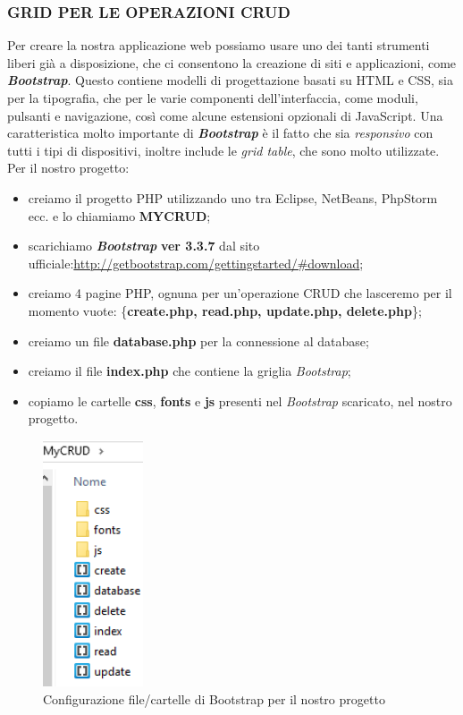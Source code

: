 \subsubsection{GRID PER LE OPERAZIONI CRUD}

Per creare la nostra applicazione web possiamo usare uno dei tanti strumenti liberi già a disposizione, che ci consentono la creazione di siti e applicazioni, come \textit{\textbf{Bootstrap}}. Questo contiene modelli di progettazione basati su HTML e CSS, sia per la tipografia, che per le varie componenti dell'interfaccia, come moduli, pulsanti e navigazione, così come alcune estensioni opzionali di JavaScript.  
Una caratteristica molto importante di \textit{\textbf{Bootstrap}} è il fatto che sia \textit{responsivo} con tutti i tipi di dispositivi, inoltre include le \textit{grid table}, che sono molto utilizzate.  
Per il nostro progetto:   

\begin{itemize}

\item creiamo il progetto PHP utilizzando uno tra Eclipse, NetBeans, PhpStorm ecc. e lo chiamiamo \textbf{MYCRUD};
\item scarichiamo \textit{\textbf{Bootstrap}} \textbf{ver 3.3.7} dal sito ufficiale:\newline\url{http://getbootstrap.com/gettingstarted/#download};
\item creiamo 4 pagine PHP, ognuna per un’operazione CRUD che lasceremo per il momento vuote: \{\textbf{create.php, read.php, update.php, delete.php}\};
\item creiamo un file \textbf{database.php} per la connessione al database;
\item creiamo il file \textbf{index.php} che contiene la griglia \textit{Bootstrap};
\item copiamo le cartelle \textbf{css}, \textbf{fonts} e \textbf{js} presenti nel \textit{Bootstrap} scaricato, nel nostro progetto.

\end{itemize} 

\begin{center}
\begin{figure}[H]
\centering
\includegraphics[scale=1]{figures/MyCRUD.png}
\caption{Configurazione file/cartelle di Bootstrap per il nostro progetto} 
\end{figure}
\end{center} 

